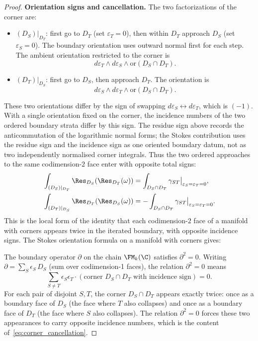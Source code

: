 \begin{proof}
\textbf{Orientation signs and cancellation.}
The two factorizations of the corner are:
\begin{itemize}
\item $(D_S)|_{D_T}$: first go to $D_T$ (set $\varepsilon_T = 0$), then within $D_T$ approach $D_S$ (set $\varepsilon_S = 0$). The boundary orientation uses outward normal first for each step. The ambient orientation restricted to the corner is
\[
d\varepsilon_T \wedge d\varepsilon_S \wedge \text{or}(D_S \cap D_T).
\]
\item $(D_T)|_{D_S}$: first go to $D_S$, then approach $D_T$. The orientation is
\[
d\varepsilon_S \wedge d\varepsilon_T \wedge \text{or}(D_S \cap D_T).
\]
\end{itemize}
These two orientations differ by the sign of swapping
$d\varepsilon_S \leftrightarrow d\varepsilon_T$, which is $(-1)$.
With a single orientation fixed on the corner, the incidence numbers of
the two ordered boundary strata differ by this sign. The residue sign
above records the anticommutation of the logarithmic normal forms;
the Stokes contribution uses the residue sign and the incidence sign
as one oriented boundary datum, not as two independently normalised
corner integrals. Thus the two ordered approaches to the same
codimension-$2$ face enter with opposite total signs:
\begin{align*}
&\int_{(D_S)|_{D_T}} \Res_{D_S}(\Res_{D_T}(\omega))
 = \int_{D_S \cap D_T} \gamma_{ST}\big|_{\varepsilon_S=\varepsilon_T=0}, \\
&\int_{(D_T)|_{D_S}} \Res_{D_T}(\Res_{D_S}(\omega))
 = -\int_{D_S \cap D_T} \gamma_{ST}\big|_{\varepsilon_S=\varepsilon_T=0}.
\end{align*}
This is the local form of the identity that each codimension-$2$ face
of a manifold with corners appears twice in the iterated boundary, with
opposite incidence signs. The Stokes orientation formula on a manifold
with corners gives:

The boundary operator $\partial$ on the chain $\FM_k(\C)$ satisfies $\partial^2 = 0$. Writing $\partial = \sum_S \epsilon_S\, D_S$ (sum over codimension-1 faces), the relation $\partial^2 = 0$ means
\[
\sum_{S \neq T} \epsilon_S \epsilon_T \cdot (\text{corner } D_S \cap D_T \text{ with incidence sign}) = 0.
\]
For each pair of disjoint $S, T$, the corner $D_S \cap D_T$ appears exactly twice: once as a boundary face of $D_S$ (the face where $T$ also collapses) and once as a boundary face of $D_T$ (the face where $S$ also collapses). The relation $\partial^2 = 0$ forces these two appearances to carry opposite incidence numbers, which is the content of~\eqref{eq:corner_cancellation}.


\end{proof}
